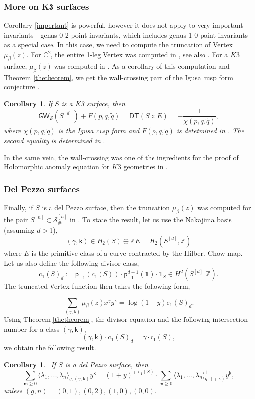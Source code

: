 \documentclass[11pt, reqno]{amsart}
\theoremstyle{plain}
\newtheorem{cor}[thm]{Corollary}
\theoremstyle{definition}
\theoremstyle{remark}
\newcommand{\BC}{{\mathbb{C}}}
\newcommand{\BZ}{{\mathbb{Z}}}
\newcommand{\CS}{{\mathcal S}}
\newcommand{\msf}{{\mathsf{m}}}
\begin{document}
\subsubsection{More on K3 surfaces}
Corollary \ref{important} is powerful, however it does not apply to very  important invariants - genus-0 2-point invariants, which includes genus-1 0-point invariants as a special case. In this case, we need to compute the truncation of  Vertex  $\mu_\beta(z)$. For $\BC^2$, the entire 1-leg Vertex was computed in \cite{MNOP1, MNOP}, see also \cite{OP10, MOOP}. For a $K3$ surface, $\mu_\beta(z)$ was computed in \cite{Ob}. As a corollary of this computation and Theorem \ref{thetheorem}, we get the wall-crossing part of the Igusa cusp form conjecture \cite{OPa}.
\begin{cor} If $S$ is a K3 surface, then
	\[ \mathsf{GW}_E(S^{[d]})+F(p,q,\tilde q)=\mathsf{DT}(S\times E)=-\frac{1}{\chi(p,q,\tilde q)},\]
	where $\chi(p,q,\tilde q)$ is the Igusa cusp form and $F(p,q,\tilde q)$ is detetmined in \cite{Ob}. The second equality is determined in \cite{OPi}. 
\end{cor}
In the same vein, the wall-crossing was one of the ingredients for the proof of Holomorphic anomaly equation for $K3$ geometries in \cite{Ob22}.

\subsubsection{Del Pezzo surfaces} \label{Delpezzo}
Finally, if $S$ is a del Pezzo surface, then the truncation $\mu_\beta(z)$ was computed for the pair $S^{[n]}\subset \CS^{[n]}_\#$ in \cite{N}. To state the result, let us use the Nakajima basis (assuming $d>1$), 
\[(\gamma,\mathsf{k})\in H_2(S) \oplus \BZ E =H_2(S^{[d]},\BZ)\]
where $E$ is the primitive class of a curve contracted by the Hilbert-Chow map. Let us also define the following divisor class, 
\[\mathrm{c}_1(S)_d:=\mathsf{p}_{-1}(c_1(S)) \cdot \mathsf{p}_{-1}^{d-1}(\mathbb 1) \cdot \mathbb 1_S \in H^2(S^{[d]},\BZ).\]
The truncated Vertex function then takes the following form, 

\[ \sum_{(\gamma,\mathsf{k})} \mu_\beta(z)x^\gamma y^\mathsf{k}=\log (1+y)\mathrm{c}_1(S)_d.\]
Using Theorem \ref{thetheorem},  the divisor equation and the following intersection number for a class $(\gamma,\mathsf{k})$, 
\[ (\gamma,\mathsf{k})\cdot\mathrm{c}_1(S)_d=\gamma  \cdot \mathrm{c}_1(S),\]
 we obtain the following result. 
\begin{cor}\ \label{important2}If $S$ is a del Pezzo surface, then 
		\[ \sum_{\msf\geq 0} \langle \lambda_1 , \dots,\lambda_n  \rangle^{-}_{g,(\gamma,\mathsf{k})} y^{\mathsf{k}} = (1+y)^{\gamma\cdot\mathrm{c}_1(S)}\cdot \sum_{\msf\geq 0}  \langle \lambda_1, \dots,\lambda_n \rangle^{+}_{g,(\gamma,\mathsf{k})}y^{\mathsf{k}},\] 
		unless $(g,n)=(0,1), (0,2), (1,0),(0,0)$. 
	\end{cor}
\vspace{0.1cm}
\end{document}
